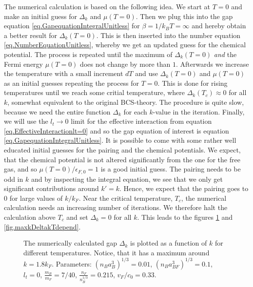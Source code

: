 The numerical calculation is based on the following idea. We start at $T = 0$ and make an initial guess for $\Delta_k$ and $\mu(T=0)$. Then we plug this into the gap equation \eqref{eq.GapequationIntegralUnitless} for $\beta = 1/k_BT = \infty$ and hereby obtain a better result for $\Delta_k(T=0)$. This is then inserted into the number equation \eqref{eq.NumberEquationUnitless}, whereby we get an updated guess for the chemical potential. The process is repeated until the maximum of $\Delta_k(T=0)$ \textit{and} the Fermi energy $\mu( T=0 )$ does not change by more than $1$\textperthousand. Afterwards we increase the temperature with a small increment $dT$ and use $\Delta_k(T=0)$ and $\mu( T=0 )$ as an initial guesses repeating the process for $T=0$. This is done for rising temperatures until we reach some critial temperature, where $\Delta_k(T_c)\approx 0$ for all $k$, somewhat equivalent to the original BCS-theory\cite{Tinkham,LandauStatPhys2,PlischkeStatPhys}. The procedure is quite slow, because we need the entire function $\Delta_k$ for each $k$-value in the iteration. Finally, we will use the $l_t \to 0$ limit for the effective interaction from equation \eqref{eq.EffectiveInteractionlt=0} and so the gap equation of interest is equation \eqref{eq.GapequationIntegralUnitless}. It is possible to come with some rather well educated initial guesses for the pairing and the chemical potentials. We expect, that the chemical potential is not altered significantly from the one for the free gas, and so $\mu(T = 0)/\epsilon_{F,0} = 1$ is a good initial guess. The pairing needs to be odd in $k$ and by inspecting the integral equation, we see that we only get significant contributions around $k' = k$. Hence, we expect that the pairing goes to 0 for large values of $k/k_F$. Near the critical temperature, $T_c$, the numerical calculation needs an increasing number of iterations. We therefore halt the calculation above $T_c$ and set $\Delta_k = 0$ for all $k$. This leads to the figures \ref{fig.Deltakkdepend} and \ref{fig.maxkDeltakTdepend}. 

\begin{figure} 
\begin{center}  
  
\caption{The numerically calculated gap $\Delta_k$ is plotted as a function of $k$ for different temperatures. Notice, that it has a maximum around $k = 1.8 k_F$. Parameters: $(n_Ba_B^3)^{1/3} = 0.01$, $(n_Ba_{BF}^3)^{1/3} = 0.1$, $l_t = 0$, $\frac{m_B}{m_F} = 7/40$, $\frac{n_F}{n_B^{1/3}} = 0.215$, $v_F/c_0 = 0.33$. }  
\label{fig.Deltakkdepend}  
\end{center}    
\end{figure}

